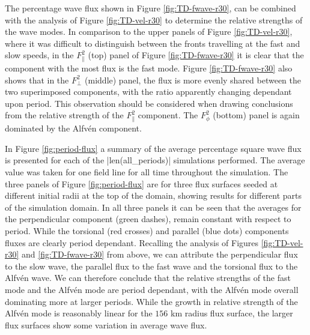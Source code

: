The percentage wave flux shown in Figure \ref{fig:TD-fwave-r30}, can be combined with the analysis of Figure \ref{fig:TD-vel-r30} to determine the relative strengths of the wave modes.
In comparison to the upper panels of Figure \ref{fig:TD-vel-r30}, where it was difficult to distinguish between the fronts travelling at the fast and slow speeds, in the $F^2_\parallel$ (top) panel of Figure \ref{fig:TD-fwave-r30} it is clear that the component with the most flux is the fast mode.
Figure \ref{fig:TD-fwave-r30} also shows that in the $F^2_\perp$ (middle) panel, the flux is more evenly shared between the two superimposed components, with the ratio apparently changing dependant upon period.
This observation should be considered when drawing conclusions from the relative strength of the $F^2_\parallel$ component.
The $F^2_\phi$ (bottom) panel is again dominated by the Alfv\'en component.

In Figure \ref{fig:period-flux} a summary of the average percentage square wave flux is presented for each of the \py[chapter6]|len(all_periods)| simulations performed.
The average value was taken for one field line for all time throughout the simulation.
The three panels of Figure \ref{fig:period-flux} are for three flux surfaces seeded at different initial radii at the top of the domain, showing results for different parts of the simulation domain.
In all three panels it can be seen that the averages for the perpendicular component (green dashes), remain constant with respect to period.
While the torsional (red crosses) and parallel (blue dots) components fluxes are clearly period dependant.
Recalling the analysis of Figures \ref{fig:TD-vel-r30} and \ref{fig:TD-fwave-r30} from above, we can attribute the perpendicular flux to the slow wave, the parallel flux to the fast wave and the torsional flux to the Alfv\'en wave.
We can therefore conclude that the relative strengths of the fast mode and the Alfv\'en mode are period dependant, with the Alfv\'en mode overall dominating more at larger periods.
While the growth in relative strength of the Alfv\'en mode is reasonably linear for the $156$ km radius flux surface, the larger flux surfaces show some variation in average wave flux. 


